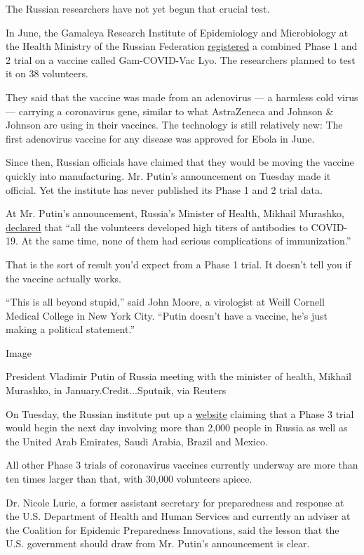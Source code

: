 The Russian researchers have not yet begun that crucial test.

In June, the Gamaleya Research Institute of Epidemiology and
Microbiology at the Health Ministry of the Russian Federation
\href{https://clinicaltrials.gov/ct2/show/NCT04437875?term=Gamaleya\&draw=2\&rank=2}{registered}
a combined Phase 1 and 2 trial on a vaccine called Gam-COVID-Vac Lyo.
The researchers planned to test it on 38 volunteers.

They said that the vaccine was made from an adenovirus --- a harmless
cold virus --- carrying a coronavirus gene, similar to what AstraZeneca
and Johnson \& Johnson are using in their vaccines. The technology is
still relatively new: The first adenovirus vaccine for any disease was
approved for Ebola in June.

Since then, Russian officials have claimed that they would be moving the
vaccine quickly into manufacturing. Mr. Putin's announcement on Tuesday
made it official. Yet the institute has never published its Phase 1 and
2 trial data.

At Mr. Putin's announcement, Russia's Minister of Health, Mikhail
Murashko, \href{https://www.interfax.ru/russia/721241}{declared} that
``all the volunteers developed high titers of antibodies to COVID-19. At
the same time, none of them had serious complications of immunization.''

That is the sort of result you'd expect from a Phase 1 trial. It doesn't
tell you if the vaccine actually works.

``This is all beyond stupid,'' said John Moore, a virologist at Weill
Cornell Medical College in New York City. ``Putin doesn't have a
vaccine, he's just making a political statement.''

Image

President Vladimir Putin of Russia meeting with the minister of health,
Mikhail Murashko, in January.Credit...Sputnik, via Reuters

On Tuesday, the Russian institute put up a
\href{https://sputnikvaccine.com/about-vaccine/clinical-trials/}{website}
claiming that a Phase 3 trial would begin the next day involving more
than 2,000 people in Russia as well as the United Arab Emirates, Saudi
Arabia, Brazil and Mexico.

All other Phase 3 trials of coronavirus vaccines currently underway are
more than ten times larger than that, with 30,000 volunteers apiece.

Dr. Nicole Lurie, a former assistant secretary for preparedness and
response at the U.S. Department of Health and Human Services and
currently an adviser at the Coalition for Epidemic Preparedness
Innovations, said the lesson that the U.S. government should draw from
Mr. Putin's announcement is clear.

